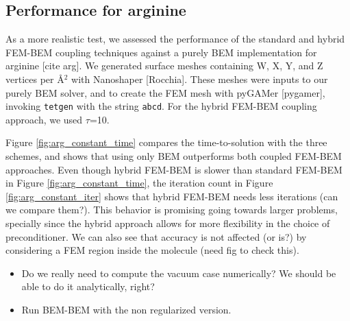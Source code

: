 \subsection*{\sffamily \large Performance for arginine}

As a more realistic test, we assessed the performance of the standard and hybrid FEM-BEM coupling techniques against a purely BEM implementation for arginine [cite arg]. 
We generated surface meshes containing W, X, Y, and Z vertices per \AA$^2$ with Nanoshaper [Rocchia].
These meshes were inputs to our purely BEM solver, and to create the FEM mesh with pyGAMer [pygamer], invoking \texttt{tetgen} with the string \texttt{abcd}.
For the hybrid FEM-BEM coupling approach, we used $\tau$=10.

Figure \ref{fig:arg_constant_time} compares the time-to-solution with the three schemes, and shows that using only BEM outperforms both coupled FEM-BEM approaches.
Even though hybrid FEM-BEM is slower than standard FEM-BEM in Figure \ref{fig:arg_constant_time}, the iteration count in Figure \ref{fig:arg_constant_iter} shows that hybrid FEM-BEM needs less iterations (can we compare them?). 
This behavior is promising going towards larger problems, specially since the hybrid approach allows for more flexibility in the choice of preconditioner.
We can also see that accuracy is not affected (or is?) by considering a FEM region inside the molecule (need fig to check this).

\begin{itemize}
\item Do we really need to compute the vacuum case numerically? We should be able to do it analytically, right?
\item Run BEM-BEM with the non regularized version.
\end{itemize}

